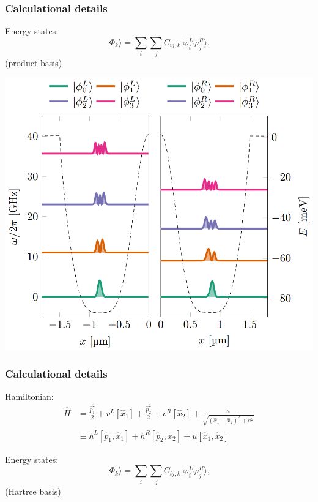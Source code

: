 \documentclass{beamer}
\begin{document}
\begin{frame}
\frametitle{Calculational details}

Energy states:
\begin{equation}
\vert\Phi_k\rangle = \sum_{i} \sum_{j} C_{ij, k}\vert \varphi^L_i \varphi^R_j\rangle,
\end{equation}
(product basis)

\vspace{6mm}

\centerline{\includegraphics[width=0.9\linewidth]{qcfigures/Hartree_states.png}}

\vspace{6mm}
\end{frame}

\begin{frame}
\frametitle{Calculational details}

Hamiltonian:
\begin{align}
\hat{H} &= \frac{\hat{p}_1^2}{2} + v^L[\hat{x}_1] + \frac{\hat{p}_2^2}{2} + v^R[\hat{x}_2] + \frac{\kappa}{\sqrt{(\hat{x}_1-\hat{x}_2)^2 + a^2}} \\
&\equiv h^L[\hat{p}_1,\hat{x}_1] + h^R[\hat{p}_2,\hat{x}_2] + u[\hat{x}_1,\hat{x}_2]
\end{align}

Energy states:
\begin{equation}
\vert\Phi_k\rangle = \sum_{i} \sum_{j} C_{ij, k}\vert \varphi^L_i \varphi^R_j\rangle,
\end{equation}
(Hartree basis)
\end{frame}
\end{document}
